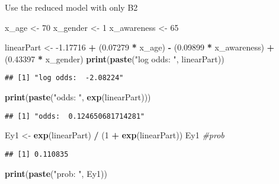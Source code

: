 \documentclass[
]{article}
\newenvironment{Shaded}{\begin{snugshade}}{\end{snugshade}}
\newcommand{\CommentTok}[1]{\textcolor[rgb]{0.56,0.35,0.01}{\textit{#1}}}
\newcommand{\DecValTok}[1]{\textcolor[rgb]{0.00,0.00,0.81}{#1}}
\newcommand{\FloatTok}[1]{\textcolor[rgb]{0.00,0.00,0.81}{#1}}
\newcommand{\KeywordTok}[1]{\textcolor[rgb]{0.13,0.29,0.53}{\textbf{#1}}}
\newcommand{\NormalTok}[1]{#1}
\newcommand{\OperatorTok}[1]{\textcolor[rgb]{0.81,0.36,0.00}{\textbf{#1}}}
\newcommand{\StringTok}[1]{\textcolor[rgb]{0.31,0.60,0.02}{#1}}
\begin{document}
Use the reduced model with only B2

\begin{Shaded}
\begin{Highlighting}[]
\NormalTok{x_age <-}\StringTok{ }\DecValTok{70}
\NormalTok{x_gender <-}\StringTok{ }\DecValTok{1}
\NormalTok{x_awareness <-}\StringTok{ }\DecValTok{65}

\NormalTok{linearPart <-}\StringTok{ }\FloatTok{-1.17716} \OperatorTok{+}\StringTok{ }\NormalTok{(}\FloatTok{0.07279} \OperatorTok{*}\StringTok{ }\NormalTok{x_age) }\OperatorTok{-}\StringTok{ }\NormalTok{(}\FloatTok{0.09899} \OperatorTok{*}\StringTok{ }\NormalTok{x_awareness) }\OperatorTok{+}\StringTok{ }\NormalTok{(}\FloatTok{0.43397} \OperatorTok{*}\StringTok{ }\NormalTok{x_gender)}
\KeywordTok{print}\NormalTok{(}\KeywordTok{paste}\NormalTok{(}\StringTok{"log odds: "}\NormalTok{, linearPart))}
\end{Highlighting}
\end{Shaded}

\begin{verbatim}
## [1] "log odds:  -2.08224"
\end{verbatim}

\begin{Shaded}
\begin{Highlighting}[]
\KeywordTok{print}\NormalTok{(}\KeywordTok{paste}\NormalTok{(}\StringTok{"odds: "}\NormalTok{, }\KeywordTok{exp}\NormalTok{(linearPart)))}
\end{Highlighting}
\end{Shaded}

\begin{verbatim}
## [1] "odds:  0.124650681714281"
\end{verbatim}

\begin{Shaded}
\begin{Highlighting}[]
\NormalTok{Ey1 <-}\StringTok{ }\KeywordTok{exp}\NormalTok{(linearPart) }\OperatorTok{/}\StringTok{ }\NormalTok{(}\DecValTok{1} \OperatorTok{+}\StringTok{ }\KeywordTok{exp}\NormalTok{(linearPart))}
\NormalTok{Ey1 }\CommentTok{#prob}
\end{Highlighting}
\end{Shaded}

\begin{verbatim}
## [1] 0.110835
\end{verbatim}

\begin{Shaded}
\begin{Highlighting}[]
\KeywordTok{print}\NormalTok{(}\KeywordTok{paste}\NormalTok{(}\StringTok{"prob: "}\NormalTok{, Ey1))}
\end{Highlighting}
\end{Shaded}
\end{document}
